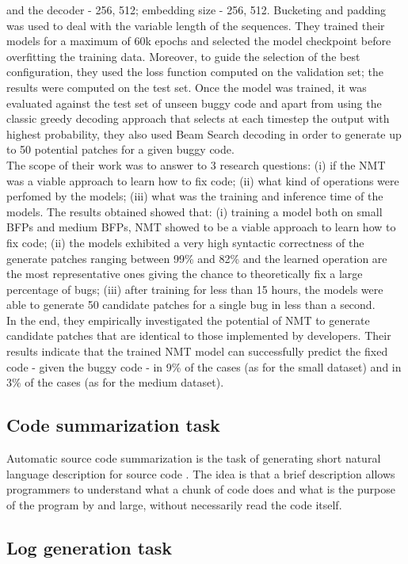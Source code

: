 and the decoder - 256, 512; embedding size - 256, 512.
Bucketing and padding was used to deal with the variable length of the sequences.
They trained their models for a maximum of 60k epochs and selected the model checkpoint before 
overfitting the training data. Moreover, to guide the selection of the best configuration, they 
used the loss function computed on the validation set; the results were computed on the test set.
Once the model was trained, it was evaluated against the test set of unseen buggy code and apart from using the classic
greedy decoding approach that selects at each timestep the output with highest probability, they also used Beam Search decoding
in order to generate up to 50 potential patches for a given buggy code.\\
\newline
The scope of their work was to answer to 3 research questions: (i) if the NMT was a viable approach 
to learn how to fix code; (ii) what kind of operations were perfomed by the models; (iii) what was the training 
and inference time of the models. The results obtained showed that: (i) training a model both on small BFPs and medium
BFPs, NMT showed to be a viable approach to learn how to fix code; (ii) the models exhibited a very high syntactic 
correctness of the generate patches ranging between 99\% and 82\% and the learned operation are the most representative ones 
giving the chance to theoretically fix a large percentage of bugs; (iii) after training for less than 15 hours,
the models were able to generate 50 candidate patches for a single bug in less than a second.\\
\newline
In the end, they empirically investigated the potential of NMT to generate
candidate patches that are identical to those implemented by developers. Their results indicate 
that the trained NMT model can successfully predict the fixed code - given the buggy code - in 9\% of the cases (as for the small dataset) and in 
3\% of the cases (as for the medium dataset).

\subsection{Code summarization task}
Automatic source code summarization is the task of generating short natural language description 
for source code \cite{Leclair2020}. The idea is that a brief description allows programmers to understand
what a chunk of code does and what is the purpose of the program by and large, without necessarily read the code 
itself.\\

\subsection{Log generation task}